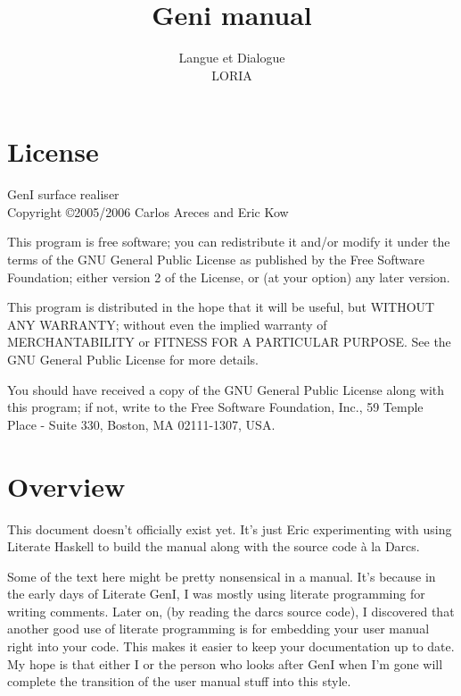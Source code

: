 \documentclass[a4paper,11pt]{report}
\begin{document}
\title{Geni manual}
\author{Langue et Dialogue\\LORIA}

\maketitle
\tableofcontents


\chapter*{License}

GenI surface realiser\\
Copyright \copyright 2005/2006 Carlos Areces and Eric Kow

\bigskip

This program is free software; you can redistribute it and/or
modify it under the terms of the GNU General Public License
as published by the Free Software Foundation; either version 2
of the License, or (at your option) any later version.

\bigskip

This program is distributed in the hope that it will be useful,
but WITHOUT ANY WARRANTY; without even the implied warranty of
MERCHANTABILITY or FITNESS FOR A PARTICULAR PURPOSE.  See the
GNU General Public License for more details.

\bigskip

You should have received a copy of the GNU General Public License
along with this program; if not, write to the Free Software
Foundation, Inc., 59 Temple Place - Suite 330, Boston, MA  02111-1307, USA.

\chapter{Overview}

This document doesn't officially exist yet.  It's just Eric
experimenting with using Literate Haskell to build the manual
along with the source code \`a la Darcs.

Some of the text here might be pretty nonsensical in a manual.  It's
because in the early days of Literate GenI, I was mostly using literate
programming for writing comments.  Later on, (by reading the darcs
source code),  I discovered that another good use of literate
programming is for embedding your user manual right into your code.
This makes it easier to keep your documentation up to date.  My hope
is that either I or the person who looks after GenI when I'm gone
will complete the transition of the user manual stuff into this style.
\end{document}
